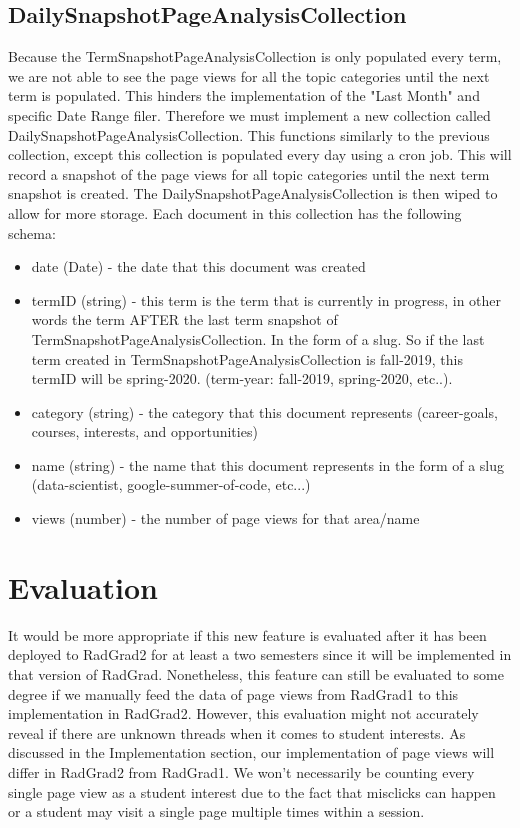 \documentclass[english]{proposalnsf}
\begin{document}
    \subsection{DailySnapshotPageAnalysisCollection}
    \label{sec:dailysnapshotpageanalysiscollection}
    Because the TermSnapshotPageAnalysisCollection is only populated every term, we are not able to see the page views for all the topic categories until the next term is populated. This hinders the implementation of the "Last Month" and specific Date Range filer. Therefore we must implement a new collection called DailySnapshotPageAnalysisCollection. This functions similarly to the previous collection, except this collection is populated every day using a cron job. This will record a snapshot of the page views for all topic categories until the next term snapshot is created. The DailySnapshotPageAnalysisCollection is then wiped to allow for more storage.
    Each document in this collection has the following schema:
    \begin{itemize}
        \item date (Date) - the date that this document was created
        \item termID (string) - this term is the term that is currently in progress, in other words the term AFTER the last term snapshot of TermSnapshotPageAnalysisCollection. In the form of a slug. So if the last term created in TermSnapshotPageAnalysisCollection is fall-2019, this termID will be spring-2020. (term-year: fall-2019, spring-2020, etc..).
        \item category (string) - the category that this document represents (career-goals, courses, interests, and opportunities)
        \item name (string) - the name that this document represents in the form of a slug (data-scientist, google-summer-of-code, etc...)
        \item views (number) - the number of page views for that area/name
    \end{itemize}

    \section{Evaluation}
    \label{sec:evaluation}
    It would be more appropriate if this new feature is evaluated after it has been deployed to RadGrad2 for at least a
    two semesters since it will be implemented in that version of RadGrad. Nonetheless, this feature can still be
    evaluated to some degree if we manually feed the data of page views from RadGrad1 to this implementation in RadGrad2.
    However, this evaluation might not accurately reveal if there are unknown threads when it comes to student interests.
    As discussed in the Implementation section, our implementation of page views will differ in RadGrad2 from RadGrad1. We
    won't necessarily be counting every single page view as a student interest due to the fact that misclicks can happen or
    a student may visit a single page multiple times within a session.
\end{document}
